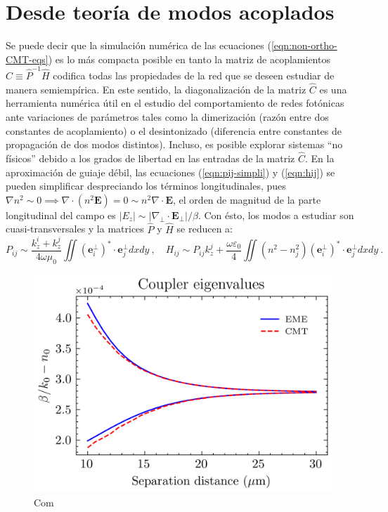 \section{Desde teoría de modos acoplados}
Se puede decir que la simulación numérica de las ecuaciones (\ref{eqn:non-ortho-CMT-eqs}) es lo más compacta posible en tanto la matriz de acoplamientos $\hat{C}\equiv \hat{P}^{-1}\hat{H}$ codifica todas las propiedades de la red que se deseen estudiar de manera semiempírica. En este sentido, la diagonalización de la matriz $\hat{C}$ es una herramienta numérica útil en el estudio del comportamiento de redes fotónicas ante variaciones de parámetros tales como la dimerización (razón entre dos constantes de acoplamiento) o el desintonizado (diferencia entre constantes de propagación de dos modos distintos). Incluso, es posible explorar sistemas ``no físicos'' debido a los grados de libertad en las entradas de la matriz $\hat{C}$. 
En la aproximación de guiaje débil, las ecuaciones
(\ref{eqn:pij-simpli}) y (\ref{eqn:hij}) se pueden simplificar despreciando los términos longitudinales, pues $\nabla n^2 \sim 0 \implies \nabla \cdot \left(n^2 \textbf{E}\right) = 0 \sim n^2 \nabla \cdot \textbf{E}$, el orden de magnitud de la parte longitudinal del campo es $| E_z | \sim |\nabla_\perp \cdot \textbf{E}_\perp |/ \beta $. Con ésto, los modos a estudiar son cuasi-transversales y la matrices $\hat{P}$ y $\hat{H}$ se reducen a:
\begin{equation*}
	P_{ij} \sim \frac{k_z^i+k_z^j}{4\omega\mu_0}\iint \left(\textbf{e}_i^\perp\right)^* \cdot \textbf{e}_j^\perp dxdy \ ,
	\quad
	H_{ij} \sim P_{ij}k_z^j+\frac{\omega \varepsilon_0}{4}\iint \left(n^2-n_j^2\right) \left(\textbf{e}_i^\perp\right)^* \cdot \textbf{e}_j^\perp dx dy \ .
\end{equation*}

\begin{figure}[H]
	\centering
	\includegraphics[width=0.8\linewidth]{codigo/dimol/coupler.png}
	\caption{Com}
\end{figure}